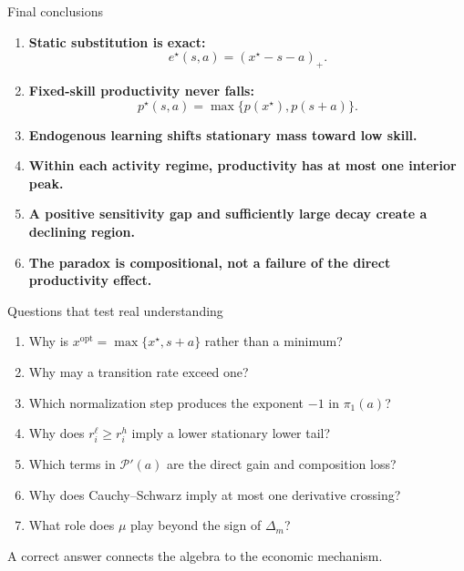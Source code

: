 \documentclass[aspectratio=169,10pt]{beamer}
\newcommand{\pos}[1]{\left(#1\right)_{+}}
\newcommand{\calP}{\mathcal{P}}
\begin{document}
\begin{frame}{Final conclusions}
\begin{enumerate}
  \item \textbf{Static substitution is exact:}
  \[
  e^\star(s,a)=\pos{x^\star-s-a}.
  \]
  \item \textbf{Fixed-skill productivity never falls:}
  \[
  p^\star(s,a)=\max\{p(x^\star),p(s+a)\}.
  \]
  \item \textbf{Endogenous learning shifts stationary mass toward low skill.}
  \item \textbf{Within each activity regime, productivity has at most one interior peak.}
  \item \textbf{A positive sensitivity gap and sufficiently large decay create a declining region.}
  \item \textbf{The paradox is compositional, not a failure of the direct productivity effect.}
\end{enumerate}
\end{frame}

\begin{frame}{Questions that test real understanding}
\begin{enumerate}
  \item Why is $x^{\mathrm{opt}}=\max\{x^\star,s+a\}$ rather than a minimum?
  \item Why may a transition rate exceed one?
  \item Which normalization step produces the exponent $-1$ in $\pi_1(a)$?
  \item Why does $r_i^\ell\ge r_i^h$ imply a lower stationary lower tail?
  \item Which terms in $\calP'(a)$ are the direct gain and composition loss?
  \item Why does Cauchy--Schwarz imply at most one derivative crossing?
  \item What role does $\mu$ play beyond the sign of $\Delta_m$?
\end{enumerate}
\vspace{3mm}
\centering
\large A correct answer connects the algebra to the economic mechanism.
\end{frame}
\end{document}
